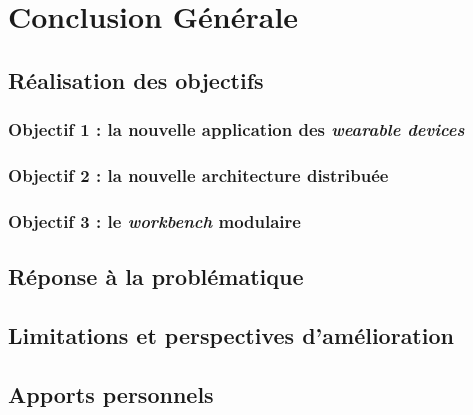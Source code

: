 \chapter{Conclusion Générale}
\label{chap:conclusion}

\section{Réalisation des objectifs}
\subsection{Objectif 1 : la nouvelle application des \textit{wearable devices}}
\subsection{Objectif 2 : la nouvelle architecture distribuée}
\subsection{Objectif 3 : le \textit{workbench} modulaire}
\section{Réponse à la problématique}
\section{Limitations et perspectives d'amélioration}
\section{Apports personnels}
